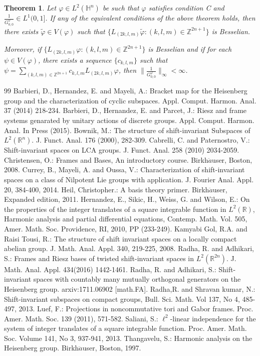 \documentclass[a4paper,12pt,reqno]{amsart}
\theoremstyle{plain}
\newtheorem{thm}{Theorem}[section]
\numberwithin{equation}{section}
\theoremstyle{definition}
\newcounter {own}
\begin{document}
\begin{thm}
Let $\varphi\in L^{2}(\mathbb{H}^{n})$ be such that $\varphi$ satisfies condition C and $\frac{1}{G_{0,0}^{\varphi}}\in L^{1}(0,1]$. If any of the equivalent conditions of the above theorem holds, then there exists $\tilde{\varphi}\in V(\varphi)$ such that $\{L_{(2k,l,m)}\tilde{\varphi}:(k,l,m)\in\mathbb{Z}^{2n+1}\}$ is Besselian.

Moreover, if $\{L_{(2k,l,m)}\varphi:(k,l,m)\in\mathbb{Z}^{2n+1}\}$ is Besselian and if for each $\psi\in V(\varphi)$, there exists a sequence $\{c_{k,l,m}\}$ such that $\psi=\sum\limits_{(k,l,m)\in\mathbb{Z}^{2n+1}}c_{k,l,m}L_{(2k,l,m)}\varphi$, then $\|\frac{1}{G_{0,0}^{\varphi}}\|_{\infty}<\infty$.
\end{thm}

\begin{thebibliography}{99}
 Barbieri, D., Hernandez, E. and Mayeli, A.: Bracket map for the Heisenberg group and the characterization of cyclic subspaces. Appl. Comput. Harmon. Anal. 37 (2014) 218-234.
 Barbieri, D., Hernandez, E. and Parcet, J.: Riesz and frame systems genarated by unitary actions of discrete groups. Appl. Comput. Harmon. Anal. In Press (2015).
 Bownik, M.: The structure of shift-invariant Subspaces of $L^{2}(\mathbb{R}^{n})$. J. Funct. Anal. 176 (2000), 282-309.
 Cabrelli, C. and Paternostro, V.: Shift-invariant spaces on LCA groups. J. Funct. Anal. 258 (2010) 2034-2059.
 Christensen, O.: Frames and Bases, An introductory course. Birkh$\ddot{a}$user, Boston, 2008.
 Currey, B., Mayeli, A. and Oussa, V.: Characterization of shift-invariant spaces on a class of Nilpotent Lie groups with application. J. Fourier Anal. Appl. 20, 384-400, 2014.
 Heil, Christopher.: A basis theory primer. Birkh$\ddot{a}$user, Expanded edition, 2011.
 Hernandez, E., Sikic, H., Weiss, G. and Wilson, E.: On the properties of the integer translates of a square integrable function in $L^{2}(\mathbb {R})$, Harmonic analysis and partial differential equations, Contemp. Math. Vol. 505, Amer. Math. Soc. Providence, RI, 2010, PP (233-249).
  Kamyabi Gol, R.A. and Raisi Tousi, R.: The structure of shift invariant spaces on a locally compact abelian group.
    J. Math. Anal. Appl. 340, 219-225, 2008.
 Radha, R. and Adhikari, S.: Frames and Riesz bases of twisted shift-invariant spaces in $L^{2}(\mathbb{R}^{2n})$. J. Math. Anal. Appl. 434(2016) 1442-1461.
 Radha, R. and Adhikari, S.: Shift-invariant spaces with countably many mutually orthogonal generators on the Heisenberg group. arxiv:1711.06902 [math.FA].
 Radha,R. and Shravan kumar, N.: Shift-invariant subspaces on compact groups, Bull. Sci. Math. Vol 137, No 4, 485-497, 2013.
 Luef, F.: Projections in noncommutative tori and Gabor frames. Proc. Amer. Math. Soc. 139 (2011), 571-582.
 Saliani, S.: $\ell^{2}$-linear independence for the system of integer translates of a square integrable function. Proc. Amer. Math. Soc. Volume 141, No 3, 937-941, 2013.
 Thangavelu, S.: Harmonic analysis on the Heisenberg group. Birkh$\ddot{a}$user, Boston, 1997.
\end{thebibliography}
  	  	
\end{document}
